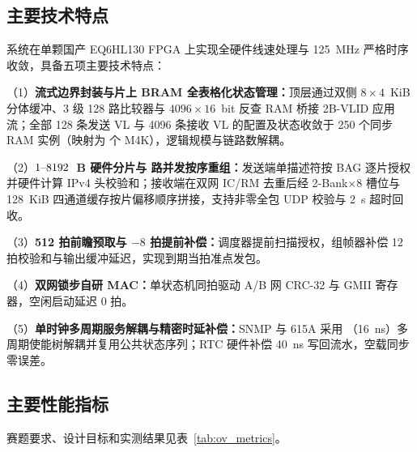 \subsection{主要技术特点}

系统在单颗国产 EQ6HL130 FPGA 上实现全硬件线速处理与 125~MHz 严格时序收敛，具备五项主要技术特点：

（1）\textbf{流式边界封装与片上 BRAM 全表格化状态管理：}顶层通过双侧 $8\times 4$~KiB 分体缓冲、3 级 128 路比较器与 $4096\times 16$~bit 反查 RAM 桥接 2B-VLID 应用流；全部 128 条发送 VL 与 4096 条接收 VL 的配置及状态收敛于 250 个同步 RAM 实例（映射为 \Mem{} 个 M4K），逻辑规模与链路数解耦。

（2）\textbf{$1\text{--}8192$~B 硬件分片与 \ReasmContexts{} 路并发按序重组：}发送端单描述符按 BAG 逐片授权并硬件计算 IPv4 头校验和；接收端在双网 IC/RM 去重后经 2-Bank$\times$8 槽位与 128~KiB 四通道缓存按片偏移顺序拼接，支持非零全包 UDP 校验与 2~s 超时回收。

（3）\textbf{512 拍前瞻预取与 $-8$ 拍提前补偿：}调度器提前扫描授权，组帧器补偿 12 拍校验和与输出缓冲延迟，实现到期当拍准点发包。

（4）\textbf{双网锁步自研 MAC：}单状态机同拍驱动 A/B 网 CRC-32 与 GMII 寄存器，空闲启动延迟 0 拍。

（5）\textbf{单时钟多周期服务解耦与精密时延补偿：}SNMP 与 615A 采用 （16~ns）多周期使能树解耦并复用公共状态序列；RTC 硬件补偿 40~ns 写回流水，空载同步零误差。

\subsection{主要性能指标}

赛题要求、设计目标和实测结果见表~\ref{tab:ov_metrics}。

